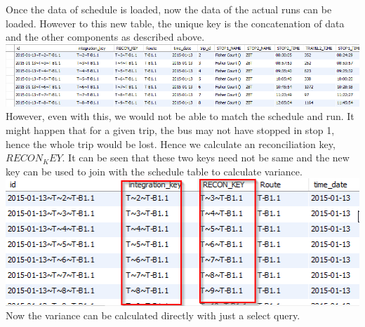 \documentclass[12pt]{article}\usepackage[]{graphicx}\usepackage[]{color}
\begin{document}
Once the data of schedule is loaded, now the data of the actual runs can be loaded. However to this new table, the unique key is the concatenation of data and the other components as described above. \\
\includegraphics[scale=0.6]{resources/wh2}\\[1cm] 
However, even with this, we would not be able to match the schedule and run. It might happen that for a given trip, the bus may not have stopped in stop 1, hence the whole trip would be lost. Hence we calculate an reconciliation key, $RECON_KEY$. It can be seen that these two keys need not be same and the new key can be used to join with the schedule table to calculate variance. \\
\includegraphics[scale=0.6]{resources/wh3}\\[1cm] 
Now the variance can be calculated directly with just a select query.

\end{document}
